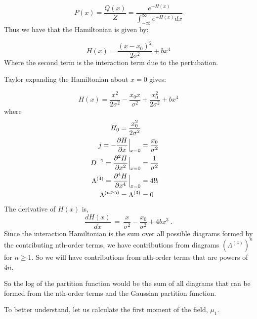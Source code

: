 \documentclass[letterpaper,12pt]{article}
\begin{document}
\begin{equation}
    P(x) = \frac{Q(x)}{Z} = \frac{e^{-H(x)}}{\int_{-\infty}^{\infty} e^{-H(x)} dx}
\end{equation}
Thus we have that the Hamiltonian is given by:

\begin{equation}
    H(x) = \frac{(x - x_{0})^{2}}{2\sigma^2} + bx^4
\end{equation}
Where the second term is the interaction term due to the pertubation.

Taylor expanding the Hamiltonian about $x = 0$ gives:

\begin{equation}
    H(x) = \frac{x^{2}}{2\sigma^2} - \frac{x_{0} x}{\sigma^2} + \frac{x_{0}^{2}}{2\sigma^2} + b x^{4} 
\end{equation}
where 
\begin{align*}
    H_{0} = \frac{x_{0}^{2}}{2\sigma^{2}} \\
    j = -\pdv{H}{x} \Big|_{x=0} &= \frac{x_{0}}{\sigma^2} \\
    D^{-1} = \pdv{^{2}H}{x^{2}} \Big|_{x=0} &= \frac{1}{\sigma^2} \\
    \Lambda^{(4)} = \pdv{^{4}H}{x^{4}} \Big|_{x=0} &= 4!b \\
    \Lambda^{(n \geq 5)} = \Lambda^{(3)} &= 0
\end{align*}
The derivative of $H(x)$ is,
\begin{equation}
    \frac{dH(x)}{dx} \: = \: \frac{x}{\sigma^{2}} - \frac{x_{0}}{\sigma^{2}} + 4bx^{3} \: .
\end{equation}
Since the interaction Hamiltonian is the sum over all possible diagrams formed by the contributing nth-order terms, we have contributions from diagrams $(\Lambda^{(4)})^{n}$ for $n \geq 1$.
So we will have contributions from nth-order terms that are powers of $4n$.

So the log of the partition function would be the sum of all diagrams that can be formed from the nth-order terms and the Gaussian partition function.

\vspace*{0.5cm}
To better understand, let us calculate the first moment of the field, $\mu_{1}$.
\end{document}
